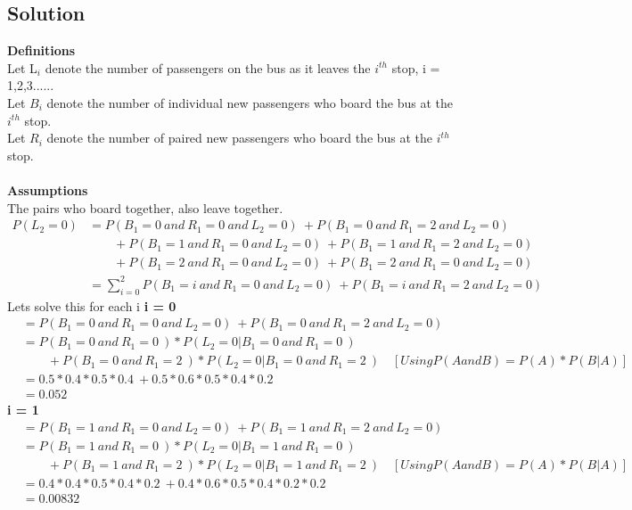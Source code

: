 \documentclass[12pt]{article}
\begin{document}
\subsection*{Solution}
\textbf{Definitions}\\
Let L$_i$ denote the number of passengers on the bus as it leaves the $i^{th}$ stop, i = 1,2,3......\\
Let $B_i$ denote the number of individual new passengers who board the bus at the $i^{th}$ stop.\\
Let $R_i$ denote the number of paired new passengers who board the bus at the $i^{th}$ stop.\\\\
\textbf{Assumptions}\\
The pairs who board together, also leave together.
\begin{align}
P(L_2=0) & = P(B_1=0\ and\ R_1=0\ and\ L_2= 0)\ +  P(B_1=0\ and\ R_1=2\ and\ L_2= 0)\  \nonumber \\
  & \qquad + P(B_1=1\ and\ R_1=0\ and\ L_2= 0)\ + P(B_1=1\ and\ R_1=2\ and\ L_2= 0)\  \nonumber \\
  & \qquad + P(B_1=2\ and\ R_1=0\ and\ L_2= 0)\ + P(B_1=2\ and\ R_1=0\ and\ L_2= 0)\  \nonumber \\
  & = \sum_{i=0}^{2} P(B_1=i\ and\ R_1=0\ and\ L_2= 0)\ +  P(B_1=i\ and\ R_1=2\ and\ L_2= 0) \nonumber
\end{align}
Lets solve this for each i
\newpage
\textbf{i = 0 }\\
\begin{align}
 & = P(B_1=0\ and\ R_1=0\ and\ L_2= 0)\ +  P(B_1=0\ and\ R_1=2\ and\ L_2= 0)   \nonumber \\
 & = P(B_1=0\ and\ R_1=0\ ) * P(L_2=0 |B_1=0\ and\ R_1=0\ )    \nonumber \\
 & \qquad + P(B_1=0\ and\ R_1=2\ ) * P(L_2=0 |B_1=0\ and\ R_1=2\ )\quad [Using  P(A and B) = P(A) * P(B|A)] \nonumber \\
 & = 0.5 * 0.4*0.5*0.4\ + 0.5*0.6*0.5*0.4*0.2 \nonumber\\
 & = 0.052 \nonumber
\end{align}
\textbf{i = 1 }\\
\begin{align}
 & = P(B_1=1\ and\ R_1=0\ and\ L_2= 0)\ +  P(B_1=1\ and\ R_1=2\ and\ L_2= 0)   \nonumber \\
 & = P(B_1=1\ and\ R_1=0\ ) * P(L_2=0 |B_1=1\ and\ R_1=0\ )    \nonumber \\
 & \qquad + P(B_1=1\ and\ R_1=2\ ) * P(L_2=0 |B_1=1\ and\ R_1=2\ )\quad [Using  P(A and B) = P(A) * P(B|A)] \nonumber \\
 & = 0.4 * 0.4 * 0.5*0.4*0.2\ + 0.4*0.6*0.5*0.4*0.2*0.2 \nonumber\\
 & = 0.00832 \nonumber
\end{align}
\end{document}
